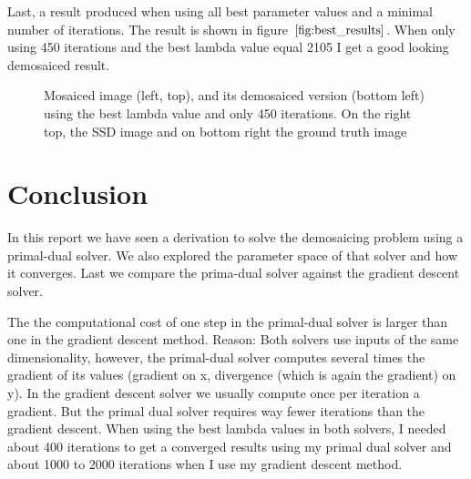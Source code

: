 \documentclass{paper}
\begin{document}
Last, a result produced when using all best parameter values and a minimal number of iterations. The result is shown in figure $\ref{fig:best_results}$. When only using 450 iterations and the best lambda value equal 2105 I get a good looking demosaiced result.

\begin{figure}[H]
\begin{center}
\end{center}
\caption{Mosaiced image (left, top), and its demosaiced version (bottom left) using the best lambda value and only 450 iterations. On the right top, the SSD image and on bottom right the ground truth image}
\label{fig:best_results}
\end{figure}


\section{Conclusion}

In this report we have seen a derivation to solve the demosaicing problem using a primal-dual solver. We also explored the parameter space of that solver and how it converges. Last we compare the prima-dual solver against the gradient descent solver.

The the computational cost of one step in the primal-dual solver is larger than one in the gradient descent method. Reason: Both solvers use inputs of the same dimensionality, however, the primal-dual solver computes several times the gradient of its values (gradient on x, divergence (which is again the gradient) on y). In the gradient descent solver we usually compute once per iteration a gradient. But the primal dual solver requires way fewer iterations than the gradient descent. When using the best lambda values in both solvers, I needed about 400 iterations to get a converged results using my primal dual solver and about 1000 to 2000 iterations when I use my gradient descent method. 
\end{document}
